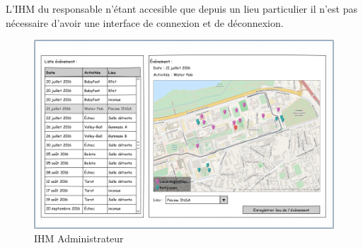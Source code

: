 \documentclass[a4paper,11pt]{article}
\begin{document}
L'IHM du responsable n'étant accesible que depuis un lieu particulier il n'est pas nécessaire d'avoir une interface de connexion et de déconnexion.

\begin{figure}[H]
  \begin{center}
    \includegraphics[width=15cm]{../../IHM/IHM_responsable.png}
    \caption{IHM Administrateur}
  \end{center}
\end{figure}
\end{document}
